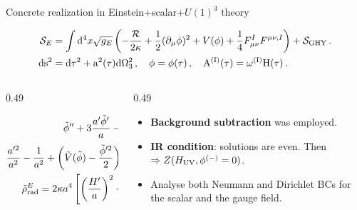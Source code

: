 \documentclass[aspectratio=169,smaller]{beamer}%
\begin{document}
\begin{frame}{Concrete realization in Einstein+scalar+$U(1)^3$ theory}
	\begin{block}{}
	\begin{equation*}
	\begin{aligned}
		\mathcal{S}_E &= \int {\rm d}^4x \sqrt{g_E} \left(-\frac{\mathcal{R}}{2\kappa} + \frac12 (\partial_\mu\phi)^2 +V(\phi) + \frac{1}{4}F_{\mu \nu}^{I} F^{\mu \nu, I} \right)+\mathcal{S}_{\rm GHY}\,.\\
    \rm{d}s^2 &= \rm{d}\tau^2 + a^2(\tau) \rm{d}\Omega_3^2\,, \quad \phi = \phi(\tau)\,, \quad A^{(I)}(\tau) = \omega^{(I)} H(\tau)\,.
	\end{aligned}
	\end{equation*}
	\end{block}
	\begin{columns}
		\begin{column}{0.49\textwidth}
			\begin{block}{}
		\begin{align*}
\tilde{\phi}''+3\frac{a'\tilde{\phi}'}{a}-\frac{{\rm d}\tilde{V}(\tilde{\phi})}{{\rm d} \tilde{\phi}} &= 0\,, 
\\
\frac{a'^2}{a^2} -\frac{1}{a^2}  + \left(\tilde{V}(\tilde{\phi})-\frac{\tilde{\phi}'^2}{2} \right) - \frac{\tilde{\rho}^E_{\rm rad}}{a^4} & =0 \,,
\\
\tilde{\rho}^E_{\rm rad} = 2\kappa a^4 \left[ \left(\frac{H'}{a} \right)^2 - \frac{4H^2}{a^4} \right] & < 0 \,
\,.
\label{eq:eoms_Eucl}
\end{align*}
	\end{block}
		\end{column}
		\pause 
		\begin{column}{0.49\textwidth}
			\begin{block}{}
				\begin{itemize}
					\item \textbf{Background subtraction} was employed.
					\item \textbf{IR condition}: solutions are even. Then $\Rightarrow Z(H_{\rm UV},\phi^{(-)}=0)$.
					\item Analyse both Neumann and Dirichlet BCs for the scalar and the gauge field.
				\end{itemize}
			\end{block}
		\end{column}
	\end{columns}
	

\end{frame}
\end{document}
